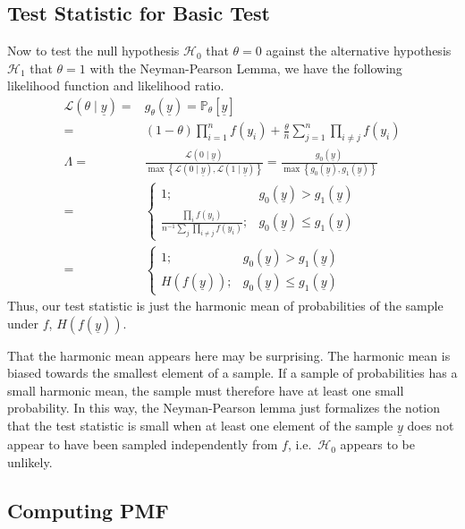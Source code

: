 \documentclass{tran-l}
\theoremstyle{cor}
\theoremstyle{definition}
\theoremstyle{remark}
\theoremstyle{conjecture}
\numberwithin{equation}{section}
\begin{document}
\subsection{Test Statistic for Basic Test}\label{sec:basic_test_test_statistic}


Now to test the null hypothesis $\mathcal{H}_0$ that $\theta = 0$ against the alternative hypothesis $\mathcal{H}_1$ that $\theta = 1$ with the Neyman-Pearson Lemma, we have the following likelihood function and likelihood ratio.
\begin{align}
\label{eqn:likelihood} \mathcal{L}(\theta \mid \underline{y}) =& g_\theta(\underline{y}) = \mathbb{P}_\theta[\underline{y}] \\
=& (1-\theta)\prod_{i =1}^n f(y_i) + \frac{\theta}{n} \sum_{j=1}^{n} \prod_{i \neq j} f(y_i) \\
\label{eqn:likelihood_ratio} \Lambda =&
\frac{\mathcal{L}(0 \mid \underline{y})}{\max\left\{\mathcal{L}(0 \mid \underline{y}), \mathcal{L}(1 \mid \underline{y})\right\}}
= \frac{g_0(\underline{y})}{\max\left\{g_0(\underline{y}), g_1(\underline{y})\right\}} \\
=& \begin{cases} 1; & g_0(\underline{y}) > g_1(\underline{y}) \\ \frac{\prod_i f(y_i)}{n^{-1} \sum_j \prod_{i \neq j} f(y_i)}; & g_0(\underline{y}) \leq g_1(\underline{y})
\end{cases}\\
=& \begin{cases} 1; & g_0(\underline{y}) > g_1(\underline{y}) \\ H(f(\underline{y})); & g_0(\underline{y}) \leq g_1(\underline{y})
\end{cases}
\end{align}
Thus, our test statistic is just the harmonic mean of probabilities of the sample under $f$, $H(f(\underline{y}))$.

That the harmonic mean appears here may be surprising.
The harmonic mean is biased towards the smallest element of a sample.
If a sample of probabilities has a small harmonic mean, the sample must therefore have at least one small probability.
In this way, the Neyman-Pearson lemma just formalizes the notion that the test statistic is small when at least one element of the sample $\underline{y}$ does not appear to have been sampled independently from $f$, i.e.\ $\mathcal{H}_0$ appears to be unlikely.


\subsection{Computing PMF}
\end{document}
